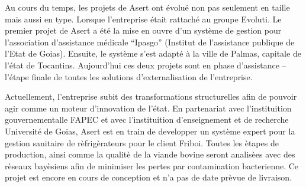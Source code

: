 


Au cours du temps, les projets de Asert ont évolué non pas seulement en taille mais aussi en type. Lorsque l'entreprise était rattaché au groupe Evoluti. Le premier projet de Asert a été la mise en ouvre d'un système de gestion pour l'association d'assistance médicale ``Ipasgo'' (Institut de l'assistance publique de l'Etat de Goias). Ensuite, le système s'est adapté à la ville de Palmas, capitale de l'état de Tocantins. Aujourd'hui ces deux projets sont en phase d'assistance -- l'étape finale de toutes les solutions d'externalisation de l'entreprise.

Actuellement, l'entreprise subit des transformations structurelles afin de pouvoir agir comme un moteur d'innovation de l'état. En partenariat avec l'instituition gouvernementalle FAPEC et avec l'instituition d'enseignement et de recherche Université de Goias, Asert est en train de developper un système expert pour la gestion sanitaire de rèfrigèrateurs pour le client Friboi. Toutes les ètapes de production, ainsi comme la qualitè de la viande bovine seront analisèes avec des rèseaux bayèsiens afin de minimiser les pertes par contamination bacterienne. Ce projet est encore en cours de conception et n'a pas de date prèvue de livraison.





